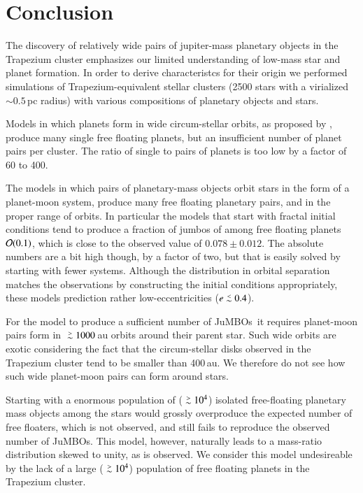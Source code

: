 \documentclass[aa]{lib/aa}
\def\apgt{\ {\raise-.5ex\hbox{$\buildrel>\over\sim$}}\ }
\def\aplt{\ {\raise-.5ex\hbox{$\buildrel<\over\sim$}}\ }
\newcommand{\jumbos}{\mbox{JuMBOs}}
\begin{document}
\section{Conclusion}

The discovery of relatively wide pairs of jupiter-mass planetary
objects in the Trapezium cluster emphasizes our limited understanding
of low-mass star and planet formation. In order to derive
characteristcs for their origin we performed simulations of
Trapezium-equivalent stellar clusters (2500 stars with a virialized
$\sim 0.5$\,pc radius) with various compositions of planetary objects
and stars.

Models in which planets form in wide circum-stellar orbits, as
proposed by \citep{2023arXiv231006016W}, produce many single free
floating planets, but an insufficient number of planet pairs per
cluster. The ratio of single to pairs of planets is too low by a
factor of 60 to 400.

The models in which pairs of planetary-mass objects orbit stars in the
form of a planet-moon system, produce many free floating planetary
pairs, and in the proper range of orbits.  In particular the models
that start with fractal initial conditions tend to produce a fraction
of jumbos of among free floating planets ${\cal O}(0.1)$, which is
close to the observed value of $0.078\pm0.012$.  The absolute numbers
are a bit high though, by a factor of two, but that is easily solved
by starting with fewer systems.  Although the distribution in orbital
separation matches the observations by constructing the initial
conditions appropriately, these models prediction rather
low-eccentricities ($e\aplt 0.4$).

For the model to produce a sufficient number of \jumbos\, it requires
planet-moon pairs form in $\apgt 1000$\,au orbits around their parent
star. Such wide orbits are exotic considering the fact that the
circum-stellar disks observed in the Trapezium cluster tend to be
smaller than 400\,au. We therefore do not see how such wide
planet-moon pairs can form around stars.

Starting with a enormous population of ($\apgt 10^4$) isolated
free-floating planetary mass objects among the stars would grossly
overproduce the expected number of free floaters, which is not
observed, and still fails to reproduce the observed number of \jumbos.
This model, however, naturally leads to a mass-ratio distribution
skewed to unity, as is observed. We consider this model undesireable
by the lack of a large ($\apgt 10^4$) population of free floating
planets in the Trapezium cluster.
\end{document}

